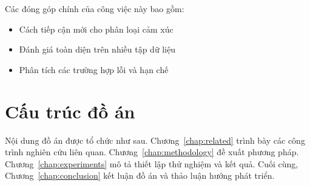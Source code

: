 Các đóng góp chính của công việc này bao gồm:
\begin{itemize}
    \item Cách tiếp cận mới cho phân loại cảm xúc
    \item Đánh giá toàn diện trên nhiều tập dữ liệu
    \item Phân tích các trường hợp lỗi và hạn chế
\end{itemize}

\section{Cấu trúc đồ án}

Nội dung đồ án được tổ chức như sau. Chương~\ref{chap:related} trình bày các công trình nghiên cứu liên quan. Chương~\ref{chap:methodology} đề xuất phương pháp. Chương~\ref{chap:experiments} mô tả thiết lập thử nghiệm và kết quả. Cuối cùng, Chương~\ref{chap:conclusion} kết luận đồ án và thảo luận hướng phát triển.
